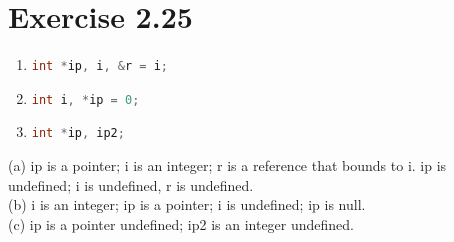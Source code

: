 \documentclass{article}
\begin{document}
\section*{Exercise 2.25}

\begin{enumerate}[label=(\alph*)]
    \item \lstinline[language=C++]|int *ip, i, &r = i;|
    \item \lstinline[language=C++]|int i, *ip = 0;|
    \item \lstinline[language=C++]|int *ip, ip2;|
\end{enumerate}

\begin{flushleft}
(a) ip is a pointer; i is an integer; r is a reference that bounds to i. ip is undefined; i is undefined, r is undefined.\\
(b) i is an integer; ip is a pointer; i is undefined; ip is null.\\
(c) ip is a pointer undefined; ip2 is an integer undefined.
\end{flushleft}
\end{document}
